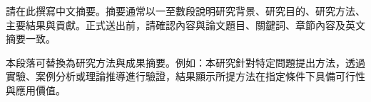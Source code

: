 請在此撰寫中文摘要。摘要通常以一至數段說明研究背景、研究目的、研究方法、主要結果與貢獻。正式送出前，請確認內容與論文題目、關鍵詞、章節內容及英文摘要一致。

本段落可替換為研究方法與成果摘要。例如：本研究針對特定問題提出方法，透過實驗、案例分析或理論推導進行驗證，結果顯示所提方法在指定條件下具備可行性與應用價值。
